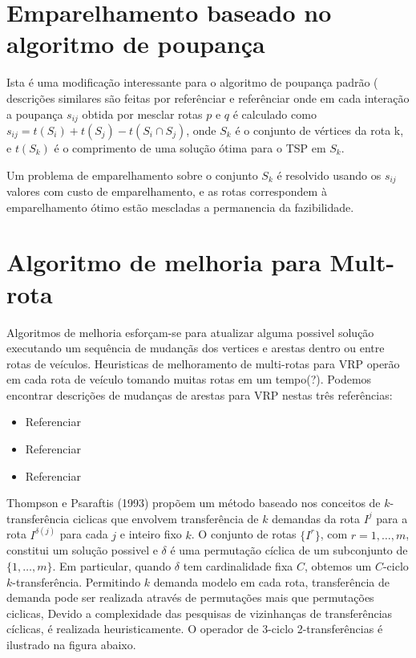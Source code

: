 \section{Emparelhamento baseado no algoritmo de poupança}

 Ista é uma modificação interessante para o algoritmo de poupança padrão ( descrições similares são
feitas por {\color{red} referênciar} e {\color{red} referênciar} onde em cada interação a poupança
$s_{ij}$ obtida por mesclar rotas $p$ e $q$ é calculado como $s_{ij} = t(S_i) + t(S_j) - t(S_i \cap
S_j)$, onde $S_k$ é o conjunto de vértices da rota k, e $t(S_k)$ é o comprimento de uma solução
ótima para o TSP em $S_k$.

 Um problema de emparelhamento sobre o conjunto $S_k$ é resolvido usando os $s_{ij}$ valores com
custo de emparelhamento, e as rotas correspondem à emparelhamento ótimo estão mescladas a
permanencia da fazibilidade.


\section{Algoritmo de melhoria para Mult-rota}

 Algoritmos de melhoria esforçam-se para atualizar alguma possivel solução executando um sequência
de mudançãs dos vertices e arestas dentro ou entre rotas de veículos. Heuristicas de melhoramento de
multi-rotas para VRP operão em cada rota de veículo tomando muitas rotas em um tempo(?). Podemos
encontrar descrições de mudanças de arestas para VRP nestas três referências:

\begin{itemize}
\item {\color{red} Referenciar}
\item {\color{red} Referenciar}
\item {\color{red} Referenciar}
\end{itemize}

 Thompson e Psaraftis (1993) propõem um método baseado nos conceitos de $k$-transferência ciclicas
que envolvem transferência de $k$ demandas da rota $I^j$ para a rota $I^{\delta(j)}$ para cada $j$ e
inteiro fixo $k$. O conjunto de rotas $\{ I^r \}$, com $r = 1, \ldots, m$, constitui um solução
possivel e $\delta$ é uma permutação cíclica de um subconjunto de $\{1, \ldots, m\}$. Em particular,
quando $\delta$ tem cardinalidade fixa $C$, obtemos um $C$-ciclo $k$-transferência. Permitindo $k$
demanda modelo em cada rota, transferência de demanda pode ser realizada através de permutações mais
que permutações ciclicas, Devido a complexidade das pesquisas de vizinhanças de transferências
cíclicas, é realizada heuristicamente. O operador de 3-ciclo 2-transferências é ilustrado na figura
abaixo.


